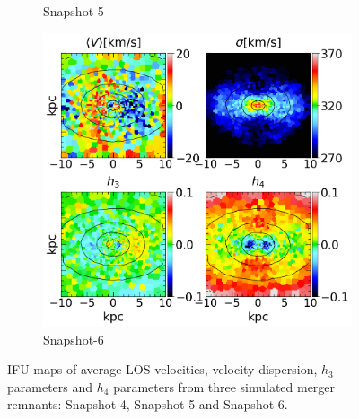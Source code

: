 \documentclass[english, oneside]{HYgradu}
\begin{document}
\begin{figure}
\begin{subfigure}[b]{0.49\textwidth}
		\caption{Snapshot-5}
	\end{subfigure}
	\begin{subfigure}[b]{0.49\textwidth}
		\includegraphics[width=\textwidth]{BH_6.png}
		\caption{Snapshot-6}
	\end{subfigure}
	\caption{IFU-maps of average LOS-velocities, velocity dispersion, $h_3$ parameters and $h_4$ parameters from three simulated merger remnants: Snapshot-4, Snapshot-5 and Snapshot-6.}
	\label{figure:all_voronoi_2}
\end{figure}



\newcommand{\apj}{The Astrophysical Journal}
\newcommand{\mnras}{Monthly Notices of the Royal Astronomical Society}
\newcommand{\apjs}{The Astrophysical Journal Supplement}
\newcommand{\nat}{Nature}
\newcommand{\aj}{The Astronomical Journal}
\newcommand{\na}{New Astronomy}
\newcommand{\araa}{Annual Review of Astronomy and Astrophysics}

\clearpage
{} %


\end{document}
